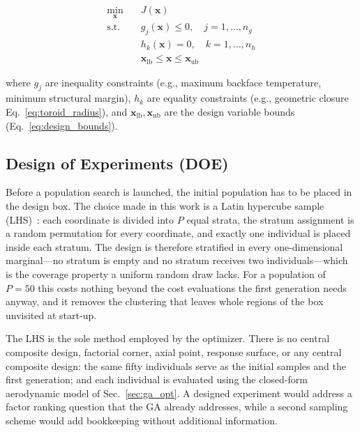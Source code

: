 \begin{equation}
    \begin{aligned}
        \min_{\mathbf{x}} \quad & J(\mathbf{x}) \\
        \text{s.t.} \quad & g_j(\mathbf{x}) \leq 0, \quad j = 1, \ldots, n_g \\
        & h_k(\mathbf{x}) = 0, \quad k = 1, \ldots, n_h \\
        & \mathbf{x}_{\text{lb}} \leq \mathbf{x} \leq \mathbf{x}_{\text{ub}}
    \end{aligned}
    \label{eq:mdo_formulation}
\end{equation}

\noindent where $g_j$ are inequality constraints (e.g., maximum backface temperature, minimum structural margin), $h_k$ are equality constraints (e.g., geometric closure Eq.~\ref{eq:toroid_radius}), and $\mathbf{x}_{\text{lb}}, \mathbf{x}_{\text{ub}}$ are the design variable bounds (Eq.~\ref{eq:design_bounds}).

\subsection{Design of Experiments (DOE)}

Before a population search is launched, the initial population has to be placed in the design box. The choice made in this work is a Latin hypercube sample (LHS)~\cite{mckay1979lhs}: each coordinate is divided into $P$ equal strata, the stratum assignment is a random permutation for every coordinate, and exactly one individual is placed inside each stratum. The design is therefore stratified in every one-dimensional marginal---no stratum is empty and no stratum receives two individuals---which is the coverage property a uniform random draw lacks. For a population of $P=50$ this costs nothing beyond the cost evaluations the first generation needs anyway, and it removes the clustering that leaves whole regions of the box unvisited at start-up.

The LHS is the sole method employed by the optimizer. There is no central composite design, factorial corner, axial point, response surface, or any central composite design: the same fifty individuals serve as the initial samples and the first generation; and each individual is evaluated using the closed-form aerodynamic model of Sec.~\ref{sec:ga_opt}. A designed experiment would address a factor ranking question that the GA already addresses, while a second sampling scheme would add bookkeeping without additional information.

